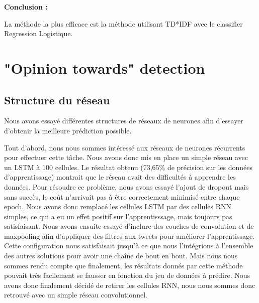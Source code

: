 \par \textbf{Conclusion :} \\
\par La méthode la plus efficace est la méthode utilisant TD*IDF avec le classifier Regression Logistique. \\


 
\section{"Opinion towards" detection}

\par 

\subsection{Structure du réseau}

\par Nous avons essayé différentes structures de réseaux de neurones afin d'essayer d'obtenir la meilleure prédiction possible.

\par Tout d'abord, nous nous sommes intéressé aux réseaux de neurones récurrents pour effectuer cette tâche. Nous avons donc mis en place un simple réseau avec un LSTM à 100 cellules. Le résultat obtenu (73,65\% de précision sur les données d'apprentissage) montrait que le réseau avait des difficultés à apprendre les données. Pour résoudre ce problème, nous avons essayé l'ajout de dropout mais sans succès, le coût n'arrivait pas à être correctement minimisé entre chaque epoch. Nous avons donc remplacé les cellules LSTM par des cellules RNN simples, ce qui a eu un effet positif sur l'apprentisssage, mais toujours pas satisfaisant. Nous avons ensuite essayé d'inclure des couches de convolution et de maxpooling afin d'appliquer des filtres aux tweets pour améliorer l'apprentissage. Cette configuration nous satisfaisait jusqu'à ce que nous l'intégrions à l'ensemble des autres solutions pour avoir une chaîne de bout en bout. Mais nous nous sommes rendu compte que finalement, les résultats donnés par cette méthode pouvait très facilement se fausser en fonction du jeu de données à prédire. Nous avons donc finalement décidé de retirer les cellules RNN, nous nous sommes donc retrouvé avec un simple réseau convolutionnel.

